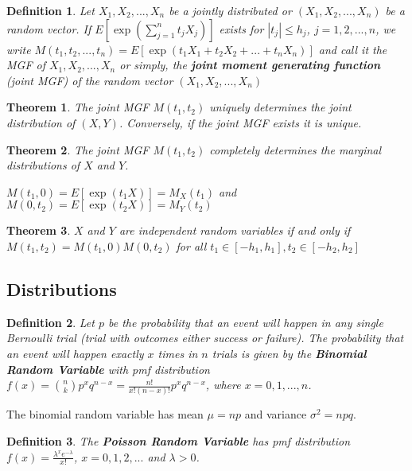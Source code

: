 \documentclass[12pt,twoside]{report}
\newtheorem{defn}{Definition}
\newtheorem{thm}{Theorem}
\begin{document}
\begin{defn}
    Let $X_1, X_2, ..., X_n$ be a jointly distributed or $(X_1, X_2, ..., X_n)$ be a random vector. If $E[\exp ( \sum_{j=1}^n t_j X_j )]$ exists for $|t_j| \leq h_j$, $j = 1, 2, ...,n$, we write $M(t_1, t_2, ..., t_n) = E[\exp(t_1 X_1 + t_2 X_2 + ... + t_n X_n)]$ and call it the MGF of $X_1, X_2, ..., X_n$ or simply, the \textbf{joint moment generating function} (joint MGF) of the random vector $(X_1, X_2, ..., X_n)$
\end{defn}

\begin{thm}
    The joint MGF $M(t_1, t_2)$ uniquely determines the joint distribution of $(X, Y)$.
    Conversely, if the joint MGF exists it is unique.
\end{thm}

\begin{thm}
    The joint MGF $M(t_1, t_2)$ completely determines the marginal distributions of $X$ and $Y$.

    $M(t_1, 0) = E[\exp(t_1 X)] = M_X (t_1)$ and $M(0, t_2) = E[\exp(t_2 X)] = M_Y(t_2)$
\end{thm}

\begin{thm}
    $X$ and $Y$ are independent random variables if and only if $M(t_1, t_2) = M(t_1, 0) M(0, t_2)$ for all $t_1 \in [-h_1, h_1], t_2 \in [-h_2, h_2]$
\end{thm}

\subsection{Distributions}

\begin{defn}
    Let $p$ be the probability that an event will happen in any single Bernoulli trial (trial with outcomes either success or failure). The probability that an event will happen exactly $x$ times in $n$ trials is given by the \textbf{Binomial Random Variable} with pmf distribution $f(x) = {n \choose k} p^x q^{n-x} = \displaystyle \frac{n!}{x! (n-x)!} p^x q^{n-x}$, where $x = 0, 1, ... , n$.
\end{defn}

The binomial random variable has mean $\mu = np$ and variance $\sigma^2 = npq$.

\begin{defn}
    The \textbf{Poisson Random Variable} has pmf distribution $f(x) = \displaystyle \frac{\lambda^x e^{-\lambda}}{x!}$, $x = 0, 1, 2, ...$ and $\lambda > 0$.
\end{defn}
\end{document}
